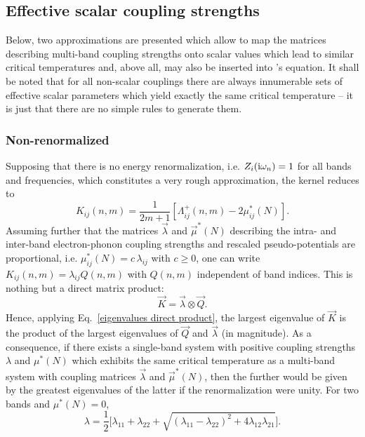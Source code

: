\subsection{Effective scalar coupling strengths}
\label{effective scalar coupling strengths}

Below, two approximations are presented which allow to map the matrices
describing multi-band coupling strengths onto scalar values which lead to
similar critical temperatures and, above all, may also be inserted into
's equation. It shall be noted that for all non-scalar couplings
there are always innumerable sets of effective scalar parameters which yield
exactly the same critical temperature -- it is just that there are no simple
rules to generate them.

\subsubsection{Non-renormalized}
\label{non-renormalized}

Supposing that there is no energy renormalization, i.e. $Z_i(\mathrm i \omega_n) = 1$
for all bands and frequencies, which constitutes a very rough approximation, the
kernel reduces to
%
\begin{equation*}
   K_{i j}(n, m) = \frac 1 {2 m + 1} [\Lambda_{i j}^+(n, m) - 2 \mu^*_{i j}(N)].
\end{equation*}
%
Assuming further that the matrices $\vec \lambda$ and $\vec \mu^*(N)$ describing
the intra- and inter-band electron-phonon coupling strengths and rescaled
 pseudo-potentials are proportional, i.e. $\mu^*_{i j}(N) = c \,
\lambda_{i j}$ with $c \ge 0$, one can write $K_{i j}(n, m) = \lambda_{i j} Q(n,
m)$ with $Q(n, m)$ independent of band indices. This is nothing but a direct
matrix product:
%
\begin{equation*}
    \vec K = \vec \lambda \otimes \vec Q.
\end{equation*}
%
Hence, applying Eq.~\ref{eigenvalues direct product}, the largest eigenvalue of
$\vec K$ is the product of the largest eigenvalues of $\vec Q$ and $\vec
\lambda$ (in magnitude). As a consequence, if there exists a single-band system
with positive coupling strengths $\lambda$ and $\mu^*(N)$ which exhibits the
same critical temperature as a multi-band system with coupling matrices $\vec
\lambda$ and $\vec \mu^*(N)$, then the further would be given by the greatest
eigenvalues of the latter if the renormalization were unity. For two bands and
$\mu^*(N) = 0$,
%
\begin{equation*}
    \lambda = \frac 1 2 \Big[ \lambda_{11} + \lambda_{22} + \sqrt{
        (\lambda_{1 1} - \lambda_{2 2})^2 + 4 \lambda_{1 2} \lambda_{2 1}
        } \Big].
\end{equation*}

